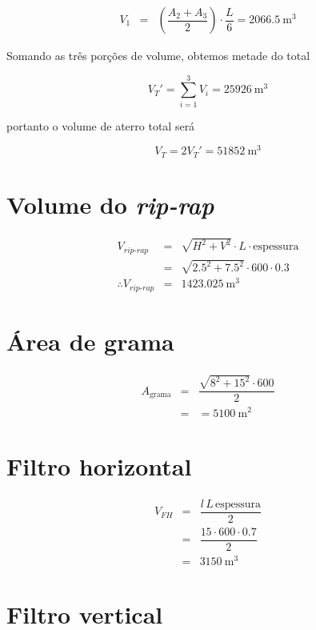 \documentclass[a4paper, 12pt, brazilian]{article}
\begin{document}
	\begin{eqnarray}
		V_{1}&=&\left(\dfrac{A_{2}+A_{3}}{2}\right)\cdot\dfrac{L}{6}=\SI{2066.5}{\meter^{3}}
	\end{eqnarray}
	
	Somando as três porções de volume, obtemos metade do total
	
	\begin{equation}
		V_{T}'=\sum\limits_{i=1}^{3}V_{i}=\SI{25926}{\meter^{3}}
	\end{equation}
	
	portanto o volume de aterro total será 
	
	\begin{equation}
		V_{T}=2V_{T}'=\SI{51852}{\meter^{3}}
	\end{equation}
	
	\section{Volume do \textit{rip-rap}}
	
	\begin{eqnarray}
		V_{\textit{rip-rap}}&=&\sqrt{H^{2}+V^{2}}\cdot L\cdot\textrm{espessura}\\
		&=&\sqrt{2.5^{2}+7.5^{2}}\cdot 600\cdot 0.3\\
		\therefore V_{\textit{rip-rap}}&=&\SI{1423.025}{\meter^{3}}
	\end{eqnarray}
	
	\section{Área de grama}
	
	\begin{eqnarray}
		A_{\textrm{grama}}&=&\dfrac{\sqrt{8^{2}+15^{2}}\cdot 600}{2}\\
		&=&=\SI{5100}{\meter^{2}}
	\end{eqnarray}
	
	\section{Filtro horizontal}
	
	\begin{eqnarray}
		V_{FH}&=&\dfrac{l\,L\,\textrm{espessura}}{2}\\
		&=&\dfrac{15\cdot 600\cdot 0.7}{2}\\
		&=&\SI{3150}{\meter^{3}}
	\end{eqnarray}
	
	\section{Filtro vertical}
	
\end{document}
